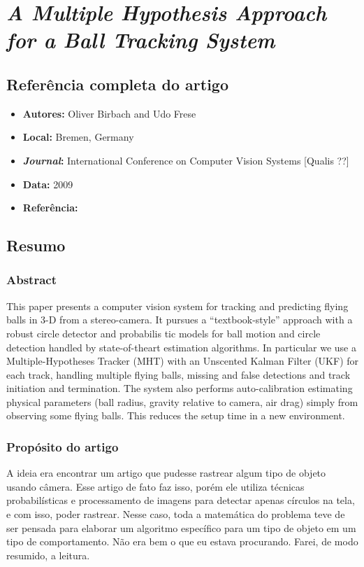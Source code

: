 \section{\textit{A Multiple Hypothesis Approach
for a Ball Tracking System}}


\subsection{Referência completa do artigo}

\begin{itemize}
  \item \textbf{Autores:} Oliver Birbach and Udo Frese
  \item \textbf{Local:} Bremen, Germany
  \item \textbf{\textit{Journal}:} International Conference on Computer Vision Systems [Qualis ??]
  \item \textbf{Data:} 2009
  \item \textbf{Referência:} 
\end{itemize}


\subsection{Resumo}

\subsubsection{Abstract}
This paper presents a computer vision system for tracking
and predicting flying balls in 3-D from a stereo-camera. It pursues a “textbook-style” approach with a robust circle detector and probabilis tic models for ball motion and circle detection handled by state-of-theart estimation algorithms. In particular we use a Multiple-Hypotheses Tracker (MHT) with an Unscented Kalman Filter (UKF) for each track, handling multiple flying balls, missing and false detections and track
initiation and termination. The system also performs auto-calibration estimating physical parameters (ball radius, gravity relative to camera, air drag) simply from observing some flying balls. This reduces the setup time in a new environment.

\subsubsection{Propósito do artigo}
A ideia era encontrar um artigo que pudesse rastrear algum tipo de objeto usando câmera. Esse artigo de fato faz isso, porém ele utiliza técnicas probabilísticas e processamento de imagens para detectar apenas círculos na tela, e com isso, poder rastrear. Nesse caso, toda a matemática do problema teve de ser pensada para elaborar um algoritmo específico para um tipo de objeto em um tipo de comportamento. Não era bem o que eu estava procurando. Farei, de modo resumido, a leitura.

